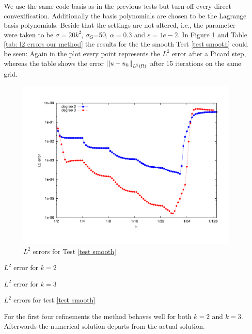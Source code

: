 We use the same code basis as in the previous tests but turn off every direct convexification. Additionally the basis polynomials are chosen to be the Lagrange basis polynomials. Beside that the settings are not altered, i.e., the parameter were taken to be $\sigma = 20 k^2$, $\sigma_G$=50, $\alpha=0.3$ and $\varepsilon = 1e-2$. 
In Figure \ref{fig: l2 errors test smooth ourMethod} and Table \ref{tab: l2 errors our method} the results for the the smooth Test \ref{test smooth}  could be seen: Again in the plot every point represents the $L^2$ error after a Picard step, whereas the table shows the error $\left\lVert u-u_h \right\rVert_{L^2(\Omega)}$ after 15 iterations on the same grid.
\begin{figure}[H]
	\centering
	\includegraphics[scale =0.4]{plots/MA1.pdf}
	\caption{$L^2$ errors for Test \ref{test smooth}}
	\label{fig: l2 errors test smooth ourMethod}
\end{figure}
\begin{table}[H]
	\centering
	\begin{subtable}[b]{0.45\textwidth}
		\centering
		\caption{$L^2$ error for $k=2$}
	\end{subtable}
	\begin{subtable}[b]{0.45\textwidth}
		\centering
		\caption{$L^2$ error for $k=3$}
	\end{subtable}
	\caption{$L^2$ errors for test \ref{test smooth}}
	\label{tab: l2 errors our method}
\end{table}
 For the first four refinements the method behaves well for both $k=2$ and $k=3$. Afterwards the numerical solution departs from the actual solution.
 
